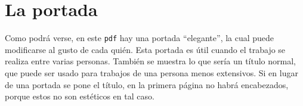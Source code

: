 \section{La portada}

\noindent Como podrá verse, en este \texttt{pdf} hay una portada ``elegante'', la cual puede modificarse al gusto de cada quién. Esta portada es útil cuando el trabajo se realiza entre varias personas. También se muestra lo que sería un título normal, que puede ser usado para trabajos de una persona menos extensivos. Si en lugar de una portada se pone el título, en la primera página no habrá encabezados, porque estos no son estéticos en tal caso.
